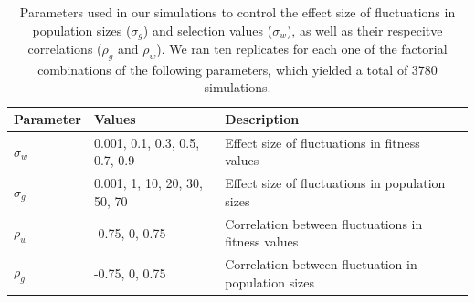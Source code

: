 \begin{table}[h]
\fontsize{10}{18}\selectfont
\centering
\caption{Parameters used in our simulations to control the effect size of fluctuations in population sizes ($\sigma_{g}$) and selection values ($\sigma_{w}$), as well as their respecitve correlations ($\rho_{g}$ and $\rho_{w}$). We ran ten replicates for each one  of the factorial combinations of the following parameters, which yielded a total of 3780 simulations. }
\begin{tabular}{@{}llll@{}}
\toprule
Parameter                    & Values                    & Description                                   &  \\ \midrule
$\sigma_{w}$ & 0.001, 0.1, 0.3, 0.5, 0.7, 0.9 & Effect size of fluctuations in fitness values &  \\
$\sigma_{g}$ & 0.001, 1, 10, 20, 30, 50, 70 & Effect size of fluctuations in population sizes                                              &  \\
$\rho_{w}$  &  -0.75, 0, 0.75                         &   Correlation between fluctuations in fitness values                                            &  \\
$\rho_{g}$  &   -0.75, 0, 0.75                        &  Correlation between fluctuation in population sizes                                             &  \\ \bottomrule
\end{tabular}
\label{tab:fluctuations}
\end{table}


